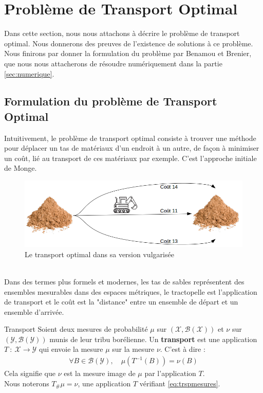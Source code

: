 \documentclass[a4paper,12pt]{article}
\begin{document}
\section{Problème de Transport Optimal}
Dans cette section, nous nous attachons à décrire le problème de transport optimal. Nous donnerons des preuves de l'existence de solutions à ce problème. Nous finirons par donner la formulation du problème par Benamou et Brenier, que nous nous attacherons de résoudre numériquement dans la partie \ref{sec:numerique}. 

\subsection{Formulation du problème de Transport Optimal}
Intuitivement, le problème de transport optimal consiste à trouver une méthode pour déplacer un tas de matériaux d'un endroit à un autre, de façon à minimiser un coût, lié au transport de ces matériaux par exemple. C'est l'approche initiale de Monge. 
\begin{figure}[!h]
\centering
\includegraphics[width=\linewidth]{img/tractopelle.png}
\caption{\label{fig:tractopelle}Le transport optimal dans sa version vulgarisée}
\end{figure}\\
Dans des termes plus formels et modernes, les tas de sables représentent des ensembles mesurables dans des espaces métriques, le tractopelle est l'application de transport et le coût est la "distance" entre un ensemble de départ et un ensemble d'arrivée. 
\begin{definition}{Transport}
Soient deux mesures de probabilité $\mu$ sur $(\mathcal{X},\mathcal{B}(\mathcal{X}))$ et $\nu$ sur $(\mathcal{Y},\mathcal{B}(\mathcal{Y}))$ munis de leur tribu borélienne. Un \textbf{transport} est une application $T\ :\ \mathcal{X}\rightarrow\mathcal{Y}$ qui envoie la mesure $\mu$ sur la mesure $\nu$. C'est à dire : 
\begin{align}
\forall B\in\mathcal{B}(\mathcal{Y}),\quad \mu(T^{-1}(B))=\nu(B)
\label{eq:trspmesures}
\end{align}
Cela signifie que $\nu$ est la mesure image de $\mu$ par l'application $T$.\\
Nous noterons $T_{\#}\mu=\nu$, une application $T$ vérifiant \eqref{eq:trspmesures}.
\end{definition}
\end{document}
